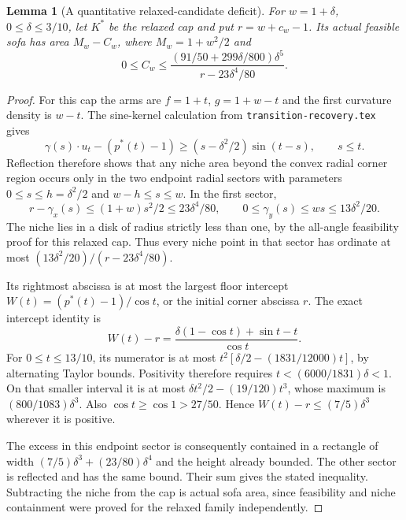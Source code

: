 \documentclass[11pt]{article}
\newtheorem{lemma}[theorem]{Lemma}
\begin{document}
\begin{lemma}[A quantitative relaxed-candidate deficit]\label{lem:trial}
For $w=1+\delta$, $0\le\delta\le3/10$, let $K^*$ be the relaxed cap and put $r=w+c_w-1$. Its actual feasible sofa has area $M_w-C_w$, where $M_w=1+w^2/2$ and
\[
 0\le C_w\le
 \frac{(91/50+299\delta/800)\delta^5}{r-23\delta^4/80}.
\]
\end{lemma}
\begin{proof}
For this cap the arms are $f=1+t$, $g=1+w-t$ and the first curvature density is $w-t$. The sine-kernel calculation from \texttt{transition-recovery.tex} gives
\[
 \gamma(s)\cdot u_t-(p^*(t)-1)
 \ge(s-\delta^2/2)\sin(t-s),\qquad s\le t.
\]
Reflection therefore shows that any niche area beyond the convex radial corner region occurs only in the two endpoint radial sectors with parameters $0\le s\le h=\delta^2/2$ and $w-h\le s\le w$. In the first sector,
\[
 r-\gamma_x(s)\le(1+w)s^2/2\le23\delta^4/80,
 \qquad 0\le\gamma_y(s)\le ws\le13\delta^2/20.
\]
The niche lies in a disk of radius strictly less than one, by the all-angle feasibility proof for this relaxed cap. Thus every niche point in that sector has ordinate at most $(13\delta^2/20)/(r-23\delta^4/80)$.

Its rightmost abscissa is at most the largest floor intercept $W(t)=(p^*(t)-1)/\cos t$, or the initial corner abscissa $r$. The exact intercept identity is
\[
 W(t)-r=\frac{\delta(1-\cos t)+\sin t-t}{\cos t}.
\]
For $0\le t\le13/10$, its numerator is at most $t^2[\delta/2-(1831/12000)t]$, by alternating Taylor bounds. Positivity therefore requires $t<(6000/1831)\delta<1$. On that smaller interval it is at most $\delta t^2/2-(19/120)t^3$, whose maximum is $(800/1083)\delta^3$. Also $\cos t\ge\cos1>27/50$. Hence $W(t)-r\le(7/5)\delta^3$ wherever it is positive.

The excess in this endpoint sector is consequently contained in a rectangle of width $(7/5)\delta^3+(23/80)\delta^4$ and the height already bounded. The other sector is reflected and has the same bound. Their sum gives the stated inequality. Subtracting the niche from the cap is actual sofa area, since feasibility and niche containment were proved for the relaxed family independently.
\end{proof}
\end{document}
